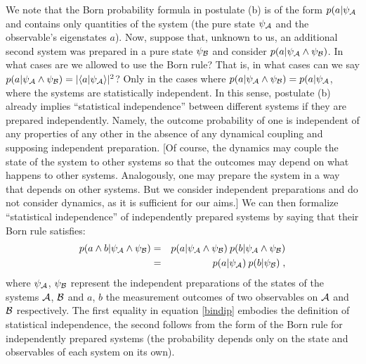 \documentclass[aps,prl,amsmath,amssymb,twocolumn,nofootinbib]{revtex4}
\theoremstyle{plain}
\theoremstyle{definition}
\theoremstyle{remark}
\def\>{\rangle}
\def\<{\langle}
\def\labell#1{\label{#1}}
\begin{document}
	We note that the Born
	probability formula in postulate (b) is of the form $p(a|\psi_{\cal A}$ and contains only quantities of the
	system (the pure state $\psi_{\cal A}$ and the observable's eigenstates $a$). Now, suppose that, unknown to us, an additional second system was prepared in a pure state $\psi_{\cal B}$ and consider $p(a|\psi_{\cal A}\wedge \psi_{\cal B})$. In what cases are we allowed to use the Born rule? That is, in what cases can we say $p(a|\psi_{\cal A}\wedge \psi_{\cal B}) = |\<a|\psi_{\cal A}\>|^2$? Only in the cases where $p(a|\psi_{\cal A}\wedge \psi_{\cal B}) = p(a|\psi_{\cal A}$, where the systems  are statistically independent. In this sense, postulate (b) already implies  ``statistical independence'' between
	different systems if they are prepared independently. Namely, the
	outcome probability of one is independent of any properties of any
	other in the absence of any dynamical coupling and supposing
	independent preparation. [Of course, the dynamics may couple the state
	of the system to other systems so that the outcomes may depend on what
	happens to other systems.  Analogously, one may prepare the system in
	a way that depends on other systems. But we consider independent
	preparations and do not consider dynamics, as it is sufficient for our
	aims.] We can then formalize ``statistical independence'' of
	independently prepared systems by saying that their Born rule
	satisfies:
	\begin{eqnarray}
	p(a\wedge b|\psi_{\cal A}\wedge \psi_{\cal B})&=&p(a|\psi_{\cal A}\wedge \psi_{\cal
		B})\:p(b|\psi_{\cal A}\wedge \psi_{\cal B})\nonumber\\&=& p(a|\psi_{\cal
		A})\:p(b|\psi_{\cal B})
	\labell{bindip}\;,
	\end{eqnarray}
	where $\psi_{\cal A}$, $\psi_{\cal B}$ represent the independent
	preparations of the states of the systems $\cal A$, $\cal B$ and $a$,
	$b$ the measurement outcomes of two observables on $\cal A$ and $\cal
	B$ respectively. The first equality in equation \eqref{bindip} embodies the
	definition of statistical independence, the second follows from the
	form of the Born rule for independently prepared systems (the
	probability depends only on the state and observables of each system
	on its own).
	
\end{document}
